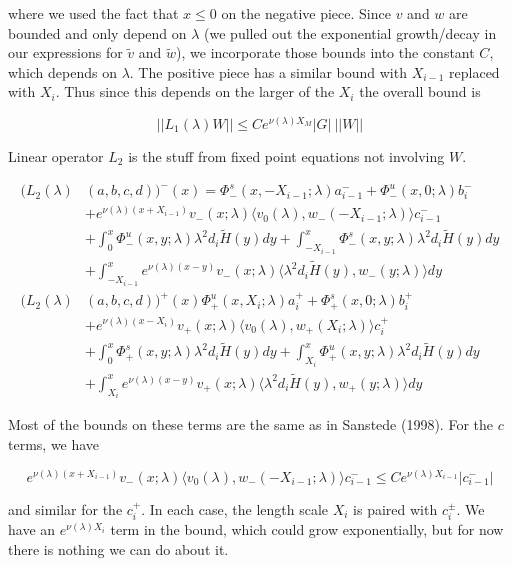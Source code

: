 \documentclass[12pt]{article}
\begin{document}
\begin{enumerate}
where we used the fact that $x \leq 0$ on the negative piece. Since $v$ and $w$ are bounded and only depend on $\lambda$ (we pulled out the exponential growth/decay in our expressions for $\tilde{v}$ and $\tilde{w}$), we incorporate those bounds into the constant $C$, which depends on $\lambda$. The positive piece has a similar bound with $X_{i-1}$ replaced with $X_i$. Thus since this depends on the larger of the $X_i$ the overall bound is 

\[
||L_1(\lambda)W|| \leq C e^{\nu(\lambda)X_M} |G| \: ||W||
\]

Linear operator $L_2$ is the stuff from fixed point equations not involving $W$.

\begin{align*}
(L_2(\lambda)&(a,b,c,d))^-(x) = \Phi^s_-(x, -X_{i-1}; \lambda)a_{i-1}^- + \Phi^u_-(x, 0; \lambda)b_i^- \\
&+ e^{\nu(\lambda)(x+X_{i-1})} v_-(x; \lambda) \langle v_0(\lambda), w_-(-X_{i-1}; \lambda) \rangle c_{i-1}^- \\
&+ \int_0^x \Phi^u_-(x, y; \lambda)\lambda^2 d_i \tilde{H}(y) dy + \int_{-X_{i-1}}^x \Phi^s_-(x, y; \lambda) \lambda^2 d_i \tilde{H}(y) dy \\
&+ \int_{-X_{i-1}}^x 
e^{\nu(\lambda)(x-y)} v_-(x; \lambda) \langle \lambda^2 d_i \tilde{H}(y), w_-(y; \lambda) \rangle dy \\
(L_2(\lambda)&(a,b,c,d))^+(x) \Phi^u_+(x, X_i; \lambda)a_i^+ + \Phi^s_+(x, 0; \lambda)b_i^+ \\
&+ e^{\nu(\lambda)(x - X_i)} v_+(x; \lambda) \langle v_0(\lambda), w_+(X_i; \lambda) \rangle c_i^+ \\
&+ \int_0^x \Phi^s_+(x, y; \lambda) \lambda^2 d_i \tilde{H}(y) dy + \int_{X_i}^x \Phi^u_+(x, y; \lambda) \lambda^2 d_i \tilde{H}(y) dy \\
&+ \int_{X_i}^x e^{\nu(\lambda)(x-y)} v_+(x; \lambda) \langle \lambda^2 d_i \tilde{H}(y), w_+(y; \lambda) \rangle dy
\end{align*}

Most of the bounds on these terms are the same as in Sanstede (1998). For the $c$ terms, we have

\[
e^{\nu(\lambda)(x+X_{i-1})} v_-(x; \lambda) \langle v_0(\lambda), w_-(-X_{i-1}; \lambda) \rangle c_{i-1}^- \leq C e^{\nu(\lambda) X_{i-1} }|c_{i-1}^-|
\]

and similar for the $c_i^+$. In each case, the length scale $X_i$ is paired with $c_i^\pm$. We have an $e^{\nu(\lambda)X_i}$ term in the bound, which could grow exponentially, but for now there is nothing we can do about it. \\


\end{enumerate}
\end{document}
